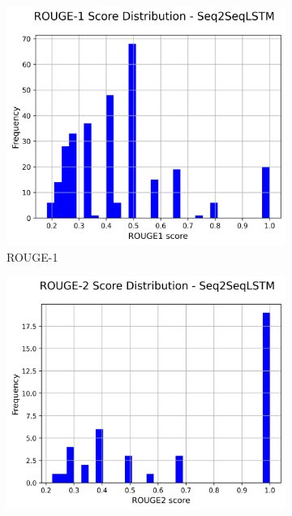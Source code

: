 \documentclass[a4paper, 12pt]{article}
\begin{document}
\begin{figure}[H]
    \centering
    \begin{subfigure}{0.32\textwidth}
        \centering
        \includegraphics[width=\textwidth]{media/Seq2SeqLSTM_rouge1_scores.png}
        \caption{ROUGE-1}
        \label{fig:rouge_1}
    \end{subfigure}
    \hfill
    \begin{subfigure}{0.32\textwidth}
        \centering
        \includegraphics[width=\textwidth]{media/Seq2SeqLSTM_rouge2_scores.png}

\end{subfigure}
\end{figure}
\end{document}
